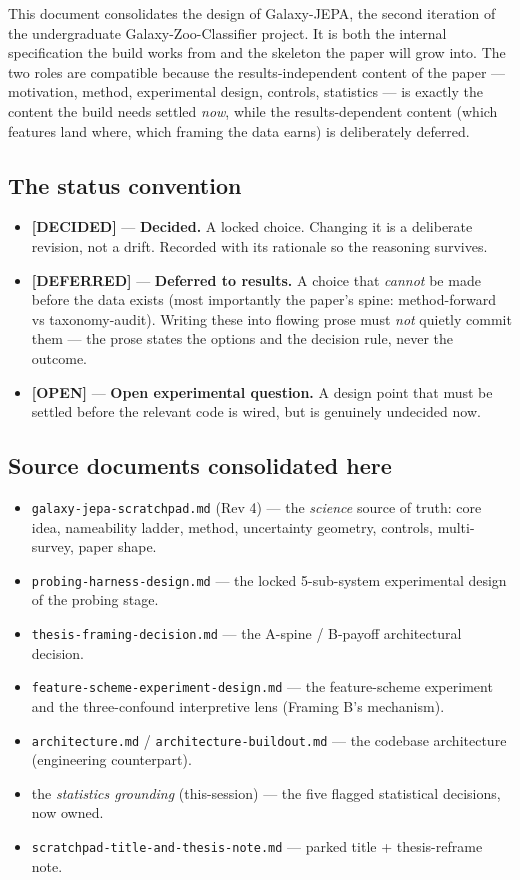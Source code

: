 \documentclass[11pt,a4paper]{article}
\newcommand{\dec}{\textcolor{decided}{\sffamily\bfseries[DECIDED]}}
\newcommand{\dfr}{\textcolor{deferred}{\sffamily\bfseries[DEFERRED]}}
\newcommand{\opn}{\textcolor{openq}{\sffamily\bfseries[OPEN]}}
\begin{document}
This document consolidates the design of Galaxy-JEPA, the second iteration of the
undergraduate Galaxy-Zoo-Classifier project. It is both the internal specification the build
works from and the skeleton the paper will grow into. The two roles are compatible because the
results-independent content of the paper --- motivation, method, experimental design, controls,
statistics --- is exactly the content the build needs settled \emph{now}, while the
results-dependent content (which features land where, which framing the data earns) is
deliberately deferred.

\subsection{The status convention}

\begin{itemize}[leftmargin=1.4em,itemsep=2pt]
\item \dec{} --- \textbf{Decided.} A locked choice. Changing it is a deliberate revision, not a
drift. Recorded with its rationale so the reasoning survives.
\item \dfr{} --- \textbf{Deferred to results.} A choice that \emph{cannot} be made before the
data exists (most importantly the paper's spine: method-forward vs taxonomy-audit). Writing
these into flowing prose must \emph{not} quietly commit them --- the prose states the options
and the decision rule, never the outcome.
\item \opn{} --- \textbf{Open experimental question.} A design point that must be settled
before the relevant code is wired, but is genuinely undecided now.
\end{itemize}

\subsection{Source documents consolidated here}


\begin{itemize}[leftmargin=1.4em,itemsep=1pt]
\item \texttt{galaxy-jepa-scratchpad.md} (Rev 4) --- the \emph{science} source of truth: core
idea, nameability ladder, method, uncertainty geometry, controls, multi-survey, paper shape.
\item \texttt{probing-harness-design.md} --- the locked 5-sub-system experimental design of the
probing stage.
\item \texttt{thesis-framing-decision.md} --- the A-spine / B-payoff architectural decision.
\item \texttt{feature-scheme-experiment-design.md} --- the feature-scheme experiment and the
three-confound interpretive lens (Framing B's mechanism).
\item \texttt{architecture.md} / \texttt{architecture-buildout.md} --- the codebase architecture
(engineering counterpart).
\item the \emph{statistics grounding} (this-session) --- the five flagged statistical decisions,
now owned.
\item \texttt{scratchpad-title-and-thesis-note.md} --- parked title + thesis-reframe note.
\end{itemize}
\end{document}
